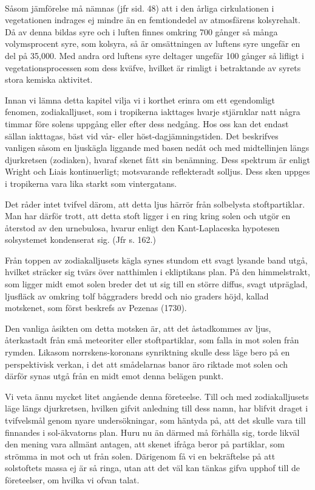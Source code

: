 \documentclass[a4paper, 12pt, oneside, swedish]{article}
\begin{document}
\paragraph{}
Såsom jämförelse må nämnas (jfr sid. 48) att i den årliga cirkulationen i vegetationen indrages ej mindre än en femtiondedel av atmosfärens kolsyrehalt. Då av denna bildas syre och i luften finnes omkring 700 gånger så många volymsprocent syre, som kolsyra, så är omsättningen av luftens syre ungefär en del på 35,000. Med andra ord luftens syre deltager ungefär 100 gånger så lifligt i vegetationsprocessen som dess kväfve, hvilket är rimligt i betraktande av syrets stora kemiska aktivitet.

Innan vi lämna detta kapitel vilja vi i korthet erinra om ett egendomligt fenomen, zodiakalljuset, som i tropikerna iakttages hvarje stjärnklar natt några timmar före solens uppgång eller efter dess nedgång. Hos oss kan det endast sällan iakttagas, bäst vid vår- eller höst-dagjämningstiden. Det beskrifves vanligen såsom en ljuskägla liggande med basen nedåt och med midtellinjen längs djurkretsen (zodiaken), hvaraf skenet fått sin benämning. Dess spektrum är enligt Wright och Liais kontinuerligt; motsvarande reflekteradt solljus. Dess sken uppges i tropikerna vara lika starkt som vintergatans.

Det råder intet tvifvel därom, att detta ljus härrör från solbelysta stoftpartiklar. Man har därför trott, att detta stoft ligger i en ring kring solen och utgör en återstod av den urnebulosa, hvarur enligt den Kant-Laplaceska hypotesen solsystemet kondenserat sig. (Jfr s. 162.)

Från toppen av zodiakalljusets kägla synes stundom ett svagt lysande band utgå, hvilket sträcker sig tvärs över natthimlen i ekliptikans plan. På den himmelstrakt, som ligger midt emot solen breder det ut sig till en större diffus, svagt utpräglad, ljusfläck av omkring tolf båggraders bredd och nio graders höjd, kallad motskenet, som först beskrefs av Pezenas (1730).

Den vanliga åsikten om detta motsken är, att det åstadkommes av ljus, återkastadt från små meteoriter eller stoftpartiklar, som falla in mot solen från rymden. Likasom norrskens-koronans synriktning skulle dess läge bero på en perspektivisk verkan, i det att smådelarnas banor äro riktade mot solen och därför synas utgå från en midt emot denna belägen punkt.

Vi veta ännu mycket litet angående denna företeelse. Till och med zodiakalljusets läge längs djurkretsen, hvilken gifvit anledning till dess namn, har blifvit draget i tvifvelsmål genom nyare undersökningar, som häntyda på, att det skulle vara till finnandes i sol-äkvatorns plan. Huru nu än därmed må förhålla sig, torde likväl den mening vara allmänt antagen, att skenet ifråga beror på partiklar, som strömma in mot och ut från solen. Därigenom få vi en bekräftelse på att solstoftets massa ej är så ringa, utan att det väl kan tänkas gifva upphof till de företeelser, om hvilka vi ofvan talat.
\clearpage
\end{document}
